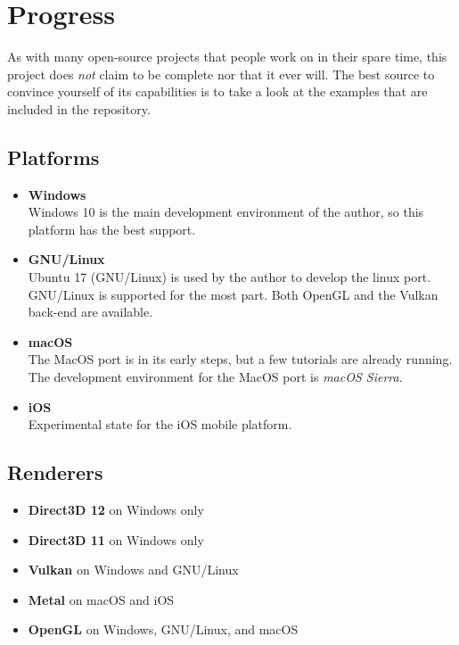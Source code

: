 \documentclass{article}
\begin{document}

\newpage
\section{Progress}

As with many open-source projects that people work on in their spare time, this project does \emph{not} claim to be complete nor that it ever will.
The best source to convince yourself of its capabilities is to take a look at the examples that are included in the \LLGL repository.

\subsection{Platforms}
\begin{itemize}
	\item \textbf{Windows} \\
	Windows 10 is the main development environment of the author, so this platform has the best support.

	\item \textbf{GNU/Linux} \\
	Ubuntu 17 (GNU/Linux) is used by the author to develop the linux port. GNU/Linux is supported for the most part.
	Both OpenGL and the Vulkan back-end are available.

	\item \textbf{macOS} \\
	The MacOS port is in its early steps, but a few tutorials are already running.
	The development environment for the MacOS port is \emph{macOS Sierra}.

	\item \textbf{iOS} \\
	Experimental state for the iOS mobile platform.
\end{itemize}

\subsection{Renderers}
\begin{itemize}
	\item \textbf{Direct3D 12} on Windows only
	\item \textbf{Direct3D 11} on Windows only
	\item \textbf{Vulkan} on Windows and GNU/Linux
	\item \textbf{Metal} on macOS and iOS
	\item \textbf{OpenGL} on Windows, GNU/Linux, and macOS
\end{itemize}
\end{document}
